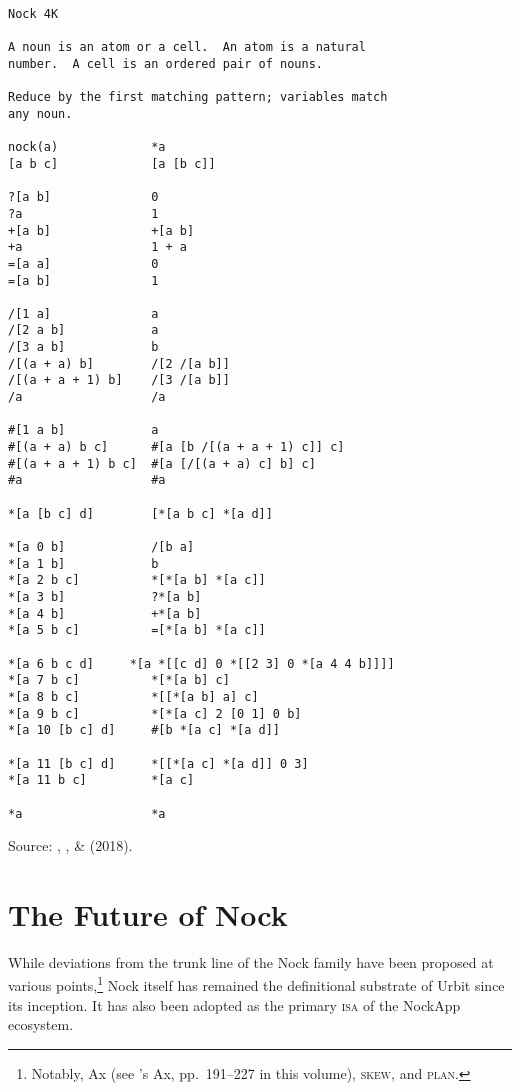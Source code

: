 \documentclass[twoside]{article}
\begin{document}
\begin{lstlisting}[label=lst:nock4k,caption={Nock 4K, \textit{terminus ad quem} 27 September 2018.},style=listingcode]
Nock 4K

A noun is an atom or a cell.  An atom is a natural
number.  A cell is an ordered pair of nouns.

Reduce by the first matching pattern; variables match
any noun.

nock(a)             *a
[a b c]             [a [b c]]

?[a b]              0
?a                  1
+[a b]              +[a b]
+a                  1 + a
=[a a]              0
=[a b]              1

/[1 a]              a
/[2 a b]            a
/[3 a b]            b
/[(a + a) b]        /[2 /[a b]]
/[(a + a + 1) b]    /[3 /[a b]]
/a                  /a

#[1 a b]            a
#[(a + a) b c]      #[a [b /[(a + a + 1) c]] c]
#[(a + a + 1) b c]  #[a [/[(a + a) c] b] c]
#a                  #a

*[a [b c] d]        [*[a b c] *[a d]]

*[a 0 b]            /[b a]
*[a 1 b]            b
*[a 2 b c]          *[*[a b] *[a c]]
*[a 3 b]            ?*[a b]
*[a 4 b]            +*[a b]
*[a 5 b c]          =[*[a b] *[a c]]

*[a 6 b c d]     *[a *[[c d] 0 *[[2 3] 0 *[a 4 4 b]]]]
*[a 7 b c]          *[*[a b] c]
*[a 8 b c]          *[[*[a b] a] c]
*[a 9 b c]          *[*[a c] 2 [0 1] 0 b]
*[a 10 [b c] d]     #[b *[a c] *[a d]]

*[a 11 [b c] d]     *[[*[a c] *[a d]] 0 3]
*[a 11 b c]         *[a c]

*a                  *a
\end{lstlisting}

Source:  , , \&  (2018). %

\section{The Future of Nock}

While deviations from the trunk line of the Nock family have been proposed at various points,\footnote{Notably, Ax (see 's Ax, pp.~191–227 in this volume), \textsc{skew}, and \textsc{plan}.} Nock itself has remained the definitional substrate of Urbit since its inception.  It has also been adopted as the primary \textsc{isa} of the NockApp ecosystem.
\end{document}
